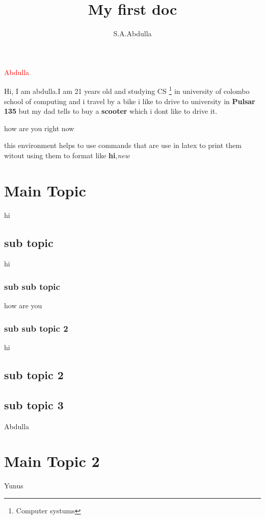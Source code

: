 \documentclass{article}
\title{My first doc}
\author{S.A.Abdulla}
\begin{document}
\maketitle
\newpage

\tableofcontents
\newpage
\listoffigures
\newpage
\listoftables
\newpage

\textcolor{red}{Abdulla} 


Hi, I am {\large abdulla}.I am 21 years old and studying CS \footnote{Computer systums} in university of colombo school of computing and i travel by a bike \newline  i like to drive to university in \textbf{Pulsar 135} but my dad tells to buy a \textbf{scooter} which i dont like to drive it\cite{book1}.

how are you right now
 
\begin{verbetim}
this environment helps to use commands that are use in latex to print them witout using them to format like \textbf{hi},\textit{new}
\end{verbetim}
\section{Main Topic}
hi
\subsection{sub topic}
hi
\newpage
\subsubsection{sub sub topic}
{\large how are you}
\subsubsection{sub sub topic 2}
hi
\subsection{sub topic 2}
\newpage
\subsection{sub topic 3}
Abdulla
\section{Main Topic 2}
Yunus\cite{book2}
\end{document}
